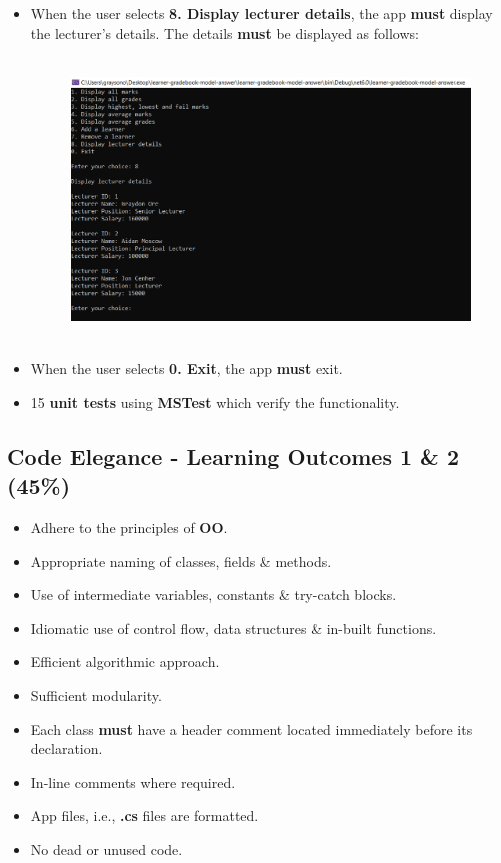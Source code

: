 \documentclass{article}
\begin{document}
\begin{itemize}
\begin{figure}[h]
    \end{figure}
    \newpage
    \item When the user selects \textbf{8. Display lecturer details}, the app \textbf{must} display the lecturer's details. The details \textbf{must} be displayed as follows:
    \begin{figure}[h]
        \centering
        \includegraphics[width=150mm,height=75mm]{../../resources/img/project-1/9.PNG}
    \end{figure}
    \item When the user selects \textbf{0. Exit}, the app \textbf{must} exit. 
    \item 15 \textbf{unit tests} using \textbf{MSTest} which verify the functionality.
\end{itemize}

\newpage
\subsection*{Code Elegance - Learning Outcomes 1 \& 2  (45\%)}
\begin{itemize}
    \item Adhere to the principles of \textbf{OO}.
    \item Appropriate naming of classes, fields \& methods.
    \item Use of intermediate variables, constants \& try-catch blocks.
    \item Idiomatic use of control flow, data structures \& in-built functions.
    \item Efficient algorithmic approach.
    \item Sufficient modularity.
    \item Each class \textbf{must} have a header comment located immediately before its declaration.
    \item In-line comments where required. 
    \item App files, i.e., \textbf{.cs} files are formatted. 
    \item No dead or unused code.
\end{itemize}
\end{document}
